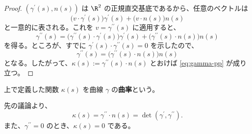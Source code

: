 \documentclass[article,paper=a4paper]{jlreq}
\begin{document}
\begin{proof}
    $(\gamma^{\prime}(s), n(s))$ は $\R^2$ の正規直交基底であるから、任意のベクトルは
    \[
        \bigl(v \cdot \gamma^{\prime}(s)\bigr)\gamma^{\prime}(s) + \bigl(v \cdot n(s)\bigr)n(s)
    \]
    と一意的に表される。これを $v = \gamma^{\prime\prime}(s)$ に適用すると、
    \[
        \gamma^{\prime\prime}(s)
        = \bigl(\gamma^{\prime\prime}(s) \cdot \gamma^{\prime}(s)\bigr)\gamma^{\prime}(s)
        + \bigl(\gamma^{\prime\prime}(s) \cdot n(s)\bigr)n(s)
    \]
    を得る。ところが、すでに $\gamma^{\prime}(s) \cdot \gamma^{\prime\prime}(s) = 0$ を示したので、
    \[
        \gamma^{\prime\prime}(s) = \bigl(\gamma^{\prime\prime}(s) \cdot n(s)\bigr)n(s)
    \]
    となる。したがって、$\kappa(s) := \gamma^{\prime\prime}(s) \cdot n(s)$ とおけば \cref{eq:gamma-pp} が成り立つ。
\end{proof}

\begin{dfn}
    上で定義した関数 $\kappa(s)$ を曲線 $\gamma$ の\textbf{曲率}という。
\end{dfn}

\begin{prop}
    先の議論より、
    \[\kappa(s) = \gamma^{\prime\prime} \cdot n(s) = \det(\gamma^{\prime}, \gamma^{\prime\prime}) .\]
    また、$\gamma^{\prime\prime} = 0$ のとき、$\kappa(s) = 0$ である。
\end{prop}
\end{document}
